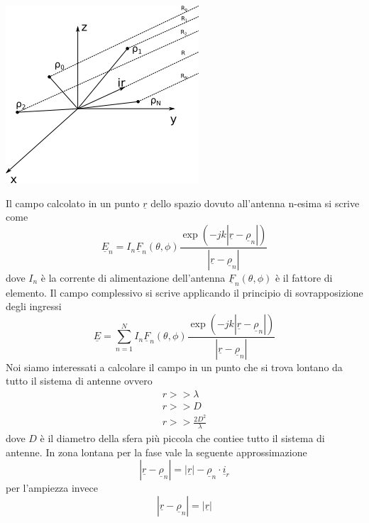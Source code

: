 \documentclass[10pt,a4paper]{book}
\begin{document}
\begin{center}
\includegraphics[scale=1]{img/Antenne/Antenna_array.png} 
\label{FIG:ANTENNA_ARRAY}
\end{center}
Il campo calcolato in un punto $\underline{r}$ dello spazio dovuto all'antenna n-esima si scrive come
\begin{equation}
\underline{E}_n = I_n \underline{F}_n(\theta,\phi) \frac{\exp\left(-j k \left|\underline{r} - \underline{\rho}_n\right| \right)}{\left|\underline{r} - \underline{\rho}_n\right|}
\end{equation}
dove $I_n$ è la corrente di alimentazione dell'antenna
$\underline{F}_n(\theta,\phi)$ è il fattore di elemento.
Il campo complessivo si scrive applicando il principio di sovrapposizione degli ingressi
\begin{equation}
\underline{E} = \sum_{n = 1}^N I_n \underline{F}_n(\theta,\phi) \frac{\exp\left(-j k \left|\underline{r} - \underline{\rho}_n\right| \right)}{\left|\underline{r} - \underline{\rho}_n\right|}
\end{equation}
Noi siamo interessati a calcolare il campo in un punto che si trova lontano da tutto il sistema di antenne ovvero 
\begin{eqnarray}
r >> \lambda \\
r >> D\\
r >> \frac{2 D^2}{\lambda}
\end{eqnarray}
dove $D$ è il diametro della sfera più piccola che contiee tutto il sistema di antenne. 
In zona lontana per la fase vale la seguente approssimazione
\begin{equation}
\left|\underline{r} - \underline{\rho}_n\right| =\left|\underline{r}\right| -  \underline{\rho}_n \cdot \underline{i}_r
\end{equation}
per l'ampiezza invece 
\begin{equation}
\left|\underline{r} - \underline{\rho}_n\right| =\left|\underline{r}\right|
\end{equation}
\end{document}
